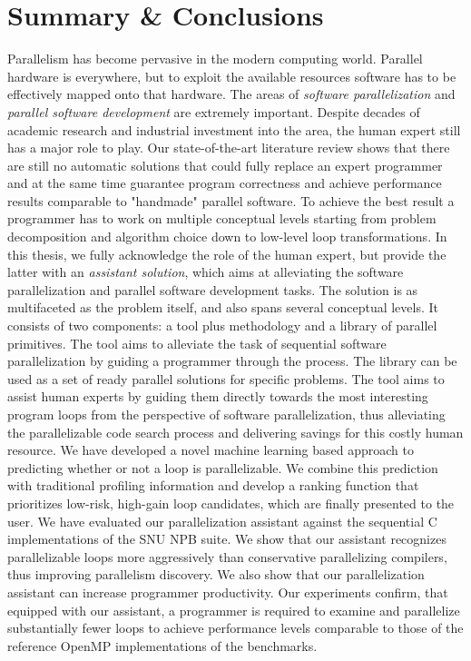 \chapter{Summary \& Conclusions}
\label{conclusion}
\quad Parallelism has become pervasive in the modern computing world. Parallel hardware is everywhere, but to exploit the available resources software has to be effectively mapped onto that hardware. The areas of \textit{software parallelization} and \textit{parallel software development} are extremely important. Despite decades of academic research and industrial investment into the area, the human expert still has a major role to play. Our state-of-the-art literature review shows that there are still no automatic solutions that could fully replace an expert programmer and at the same time guarantee program correctness and achieve performance results comparable to "handmade" parallel software.\newline\null
\quad To achieve the best result a programmer has to work on multiple conceptual levels starting from problem decomposition and algorithm choice down to low-level loop transformations. In this thesis, we fully acknowledge the role of the human expert, but provide the latter with an \textit{assistant solution}, which aims at alleviating the software parallelization and parallel software development tasks. The solution is as multifaceted as the problem itself, and also spans several conceptual levels. It consists of two components: a tool plus methodology and a library of parallel primitives. The tool aims to alleviate the task of sequential software parallelization by guiding a programmer through the process. The library can be used as a set of ready parallel solutions for specific problems.\newline\null
\quad The tool aims to assist human experts by guiding them directly towards the most interesting program loops from the perspective of software parallelization, thus alleviating the parallelizable code search process and delivering savings for this costly human resource. We have developed a novel machine learning based approach to predicting whether or not a loop is parallelizable. We combine this prediction with traditional profiling information and develop a ranking function that prioritizes low-risk, high-gain loop candidates, which are finally presented to the user.\newline\null
\quad We have evaluated our parallelization assistant against the sequential C implementations of the SNU NPB suite. We show that our assistant recognizes parallelizable loops more aggressively than conservative parallelizing compilers, thus improving parallelism discovery. We also show that our parallelization assistant can increase programmer productivity. Our experiments confirm, that equipped with our assistant, a programmer is required to examine and parallelize substantially fewer loops to achieve performance levels comparable to those of the reference OpenMP implementations of the benchmarks.\newline\null
